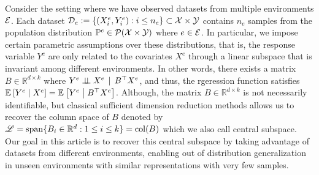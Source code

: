 Consider the setting where we have observed datasets from multiple environments $\environments$. 
Each dataset $\dataset[e] := \left\{ (X_{i}^{e}, Y_{i}^{e}) : i \leq n_e \right\} \subset \mathcal{X} \times \mathcal{Y}$ contains $n_e$ samples from the population distribution $\probability[e] \in \mathcal{P}(\mathcal{X} \times \mathcal{Y})$ where $e \in \environments$. 
In particular, we impose certain parametric assumptions over these distributions, that is, the response variable $Y^{e}$ are only related to the covariates $X^e$ through a linear subspace that is invariant among different environments.
In other words, there exists a matrix $B \in \mathbb{R}^{d \times k}$ where $ Y^{e} \indep X^{e} \given {B}^{\T} X^{e} $, and thus, the rgeression function satisfies $ \expectation{ Y^{e} \conditional X^{e} } = \expectation{ Y^{e} \conditional B^{\T} X^{e} } $.
Although, the matrix $B \in \mathbb{R}^{d \times k}$ is not necessarily identifiable, but classical sufficient dimension reduction methods allows us to recover the column space of $B$ denoted by $\mathscr{L} = \spn\{ B_{i} \in \mathbb{R}^{d} : 1 \leq i \leq k \} = \col(B)$ which we also call central subspace. 
Our goal in this article is to recover this central subspace by taking advantage of datasets from different environments, enabling out of distribution generalization in unseen environments with similar representations with very few samples.


